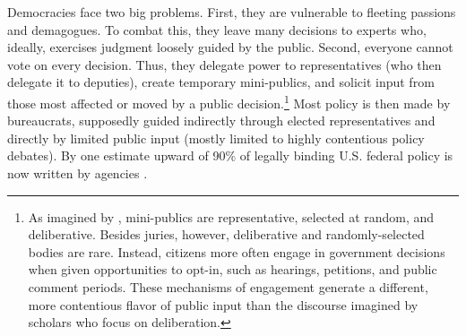 
Democracies face two big problems. First, they are vulnerable to fleeting passions and demagogues. To combat this, they leave many decisions to experts who, ideally, %
exercises judgment loosely guided by the public. Second, everyone cannot vote on every decision. Thus, they delegate power to representatives (who then delegate it to deputies), create temporary mini-publics,
and solicit input from those most affected or moved by a public decision.\footnote{
As imagined by \citet{Dahl1989}, mini-publics are representative, selected at random, and deliberative. Besides juries, however, deliberative and randomly-selected bodies are rare. Instead, citizens more often engage in government decisions when given opportunities to opt-in, such as hearings, petitions, and public comment periods. These mechanisms of engagement generate a different, more contentious flavor of public input than the discourse imagined by scholars who focus on deliberation.
}
Most policy is then made by bureaucrats, supposedly guided indirectly through elected representatives and directly by limited public input (mostly limited to highly contentious policy debates).
By one estimate upward of 90\% of legally binding U.S. federal policy is now written by agencies \citep{West2013}.




